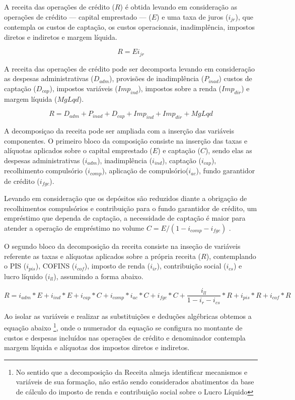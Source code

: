 \documentclass[
  12pt,
  12pt,
  openright,
  oneside,
  a4paper,
  chapter=TITLE,
  section=TITLE,
  subsection=TITLE,
  subsubsection=TITLE,
  english,
  portugues,
  sumario=tradicional]{abntex2}
\begin{document}
A receita das operações de crédito (\(R\)) é obtida levando em consideração as operações de crédito --- capital emprestado --- (\(E\)) e uma taxa de juros (\(i_{jr}\)), que contempla os custos de captação, os custos operacionais, inadimplência, impostos diretos e indiretos e margem líquida.

\begin{equation}
R = Ei_{jr}
\end{equation}

A receita das operações de crédito pode ser decomposta levando em consideração as despesas administrativas (\(D_{adm}\)), provisões de inadimplência (\(P_{inad}\)) custos de captação (\(D_{cap}\)), impostos variáveis (\(Imp_{ind}\)), impostos sobre a renda (\(Imp_{dir}\)) e margem líquida (\(MgLqd\)).

\begin{equation}
R = D_{adm} + P_{inad} + D_{cap} + Imp_{ind} + Imp_{dir} + MgLqd
\end{equation}

A decomposiçao da receita pode ser ampliada com a inserção das variáveis componentes. O primeiro bloco da composição consiste na inserção das taxas e alíquotas aplicados sobre o capital emprestado (\(E\)) e captação (\(C\)), sendo elas as despesas administrativas (\(i_{adm}\)), inadimplência (\(i_{ind}\)), captação (\(i_{cap}\)), recolhimento compulsório (\(i_{comp}\)), aplicação de compulsório(\(i_{ac}\)), fundo garantidor de crédito (\(i_{fgc}\)).

Levando em consideração que os depósitos são reduzidos diante a obrigação de recolhimentos compulsórios e contribuição para o fundo garantidor de crédito, um empréstimo que dependa de captação, a necessidade de captação é maior para atender a operação de empréstimo no volume \(C = E / (1 - i_{comp} - i_{fgc})\) \cite{cardoso:1999}.

O segundo bloco da decomposição da receita consiste na inseção de variáveis referente as taxas e alíquotas aplicados sobre a própria receita (\(R\)), contemplando o PIS (\(i_{pis}\)), COFINS (\(i_{cof}\)), imposto de renda (\(i_{ir}\)), contribuição social (\(i_{cs}\)) e lucro líquido (\(i_{ll}\)), assumindo a forma abaixo.

\begin{equation}
R = i_{adm}*E + i_{ind}*E + i_{cap}*C + i_{comp}*i_{ac}*C + i_{fgc}*C + \frac{i_{ll}}{1 - i_{r} - i_{cs}}*R + i_{pis}*R + i_{cof}*R 
\end{equation}

Ao isolar as variáveis e realizar as substituições e deduções algébricas obtemos a equação abaixo \footnote{No sentido que a decomposição da Receita almeja identificar mecanismos e variáveis de sua formação, não estão sendo considerados abatimentos da base de cálculo do imposto de renda e contribuição social sobre o Lucro Líquido}, onde o numerador da equação se configura no montante de custos e despesas incluídos nas operações de crédito e denominador contempla margem líquida e alíquotas dos impostos diretos e indiretos.
\end{document}
